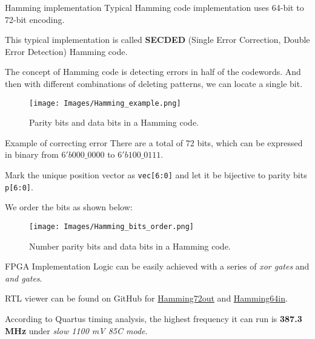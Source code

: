 \documentclass{beamer}
\begin{document}
\begin{frame}{Hamming implementation}
    Typical Hamming code implementation uses 64-bit to 72-bit encoding.

    This typical implementation is called \textbf{SECDED} (Single Error Correction,
    Double Error Detection) Hamming code.

    The concept of Hamming code is detecting errors in half of the codewords. And
    then with different combinations of deleting patterns, we can locate a single
    bit.

    \begin{figure}[htbp]
        \centerline{\texttt{[image: Images/Hamming\_example.png]}}
        \caption{Parity bits and data bits in a Hamming code.}
    \end{figure}
\end{frame}

\begin{frame}{Example of correcting error}
    There are a total of 72 bits, which can be expressed in binary from $6'b000\_0000$ to $6'b 100\_0111$.

    Mark the unique position vector as \texttt{vec[6:0]} and let it be bijective to
    parity bits \texttt{p[6:0]}.

    We order the bits as shown below:

    \begin{figure}[htbp]
        \centerline{\texttt{[image: Images/Hamming\_bits\_order.png]}}
        \caption{Number parity bits and data bits in a Hamming code.}
    \end{figure}
\end{frame}

\begin{frame}{FPGA Implementation}
    Logic can be easily achieved with a series of \textit{xor gates} and \textit{and gates}.

    RTL viewer can be found on GitHub for \href{https://github.com/luckunately/ELEC433-Projects/blob/add-tex/Hamming72out/Hamming72out_RTL.pdf}{Hamming72out} and \href{https://github.com/luckunately/ELEC433-Projects/blob/add-tex/Hamming64in/Hamming64inRTL.pdf}{Hamming64in}.

    According to Quartus timing analysis, the highest frequency it can run is
    \textbf{387.3 MHz} under \textit{slow 1100 mV 85C mode}.
\end{frame}
\end{document}
